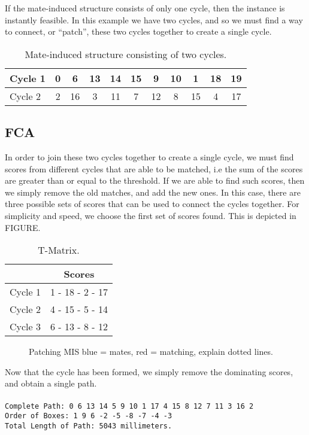 \documentclass[a4paper, 11pt, twoside, onecolumn, openany]{article}
\newcommand{\code}[1]{\colorbox{light-gray}{\texttt{#1}}}
\begin{document}
If the mate-induced structure consists of only one cycle, then the instance is instantly feasible. In this example we have two cycles, and so we must find a way to connect, or ``patch'', these two cycles together to create a single cycle.


\begin{table}[htb]
	\centering
	\begin{tabular}{|l*{10}{|c}|}
		\hline
		Cycle 1 & 0 & 6 & 13 & 14 & 15 & 9 & 10 & 1 & 18 & 19 \\ \hline
		Cycle 2 & 2 & 16 & 3 & 11 & 7 & 12 & 8 & 15 & 4 & 17 \\
		\hline
	\end{tabular}
	\caption{Mate-induced structure consisting of two cycles.}	
\end{table}

\subsection{FCA}%
In order to join these two cycles together to create a single cycle, we must find scores from different cycles that are able to be matched, i.e the sum of the scores are greater than or equal to the threshold. If we are able to find such scores, then we simply remove the old matches, and add the new ones. In this case, there are three possible sets of scores that can be used to connect the cycles together. For simplicity and speed, we choose the first set of scores found. This is depicted in FIGURE.
 

\begin{table}[htb]
	\centering
	\begin{tabular}{c|c|}
		\cline{2-2}
		& Scores \\ \hline
		\multicolumn{1}{|c|}{Cycle 1} & 1 - 18 - 2 - 17 \\ \hline
		\multicolumn{1}{|c|}{Cycle 2} & 4 - 15 - 5 - 14 \\ \hline
		\multicolumn{1}{|c|}{Cycle 3} & 6 - 13 - 8 - 12 \\
		\hline
	\end{tabular}
	\caption{T-Matrix.}
\end{table}	


\begin{figure}[htb]
	\centering
	
	\caption{Patching MIS blue = mates, red = matching, explain dotted lines.}	
\end{figure}

Now that the cycle has been formed, we simply remove the dominating scores, and obtain a single path.\\
\\
\code{Complete Path: 0 6 13 14 5 9 10 1 17 4 15 8 12 7 11 3 16 2}\\
\code{Order of Boxes: 1 9 6 -2 -5 -8 -7 -4 -3}\\
\code{Total Length of Path: 5043 millimeters.}
\end{document}
